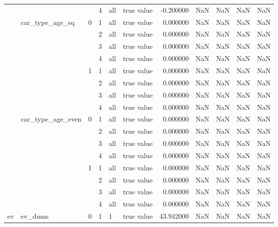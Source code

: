 \begin{tabular}{llllllrrrrr}
 &  &  & 4 & all & true value & -0.200000 & NaN & NaN & NaN & NaN \\
\cline{2-11} \cline{3-11} \cline{4-11} \cline{5-11}
 & \multirow[t]{8}{*}{car_type_age_sq} & \multirow[t]{4}{*}{0} & 1 & all & true value & 0.000000 & NaN & NaN & NaN & NaN \\
\cline{4-11} \cline{5-11}
 &  &  & 2 & all & true value & 0.000000 & NaN & NaN & NaN & NaN \\
\cline{4-11} \cline{5-11}
 &  &  & 3 & all & true value & 0.000000 & NaN & NaN & NaN & NaN \\
\cline{4-11} \cline{5-11}
 &  &  & 4 & all & true value & 0.000000 & NaN & NaN & NaN & NaN \\
\cline{3-11} \cline{4-11} \cline{5-11}
 &  & \multirow[t]{4}{*}{1} & 1 & all & true value & 0.000000 & NaN & NaN & NaN & NaN \\
\cline{4-11} \cline{5-11}
 &  &  & 2 & all & true value & 0.000000 & NaN & NaN & NaN & NaN \\
\cline{4-11} \cline{5-11}
 &  &  & 3 & all & true value & 0.000000 & NaN & NaN & NaN & NaN \\
\cline{4-11} \cline{5-11}
 &  &  & 4 & all & true value & 0.000000 & NaN & NaN & NaN & NaN \\
\cline{2-11} \cline{3-11} \cline{4-11} \cline{5-11}
 & \multirow[t]{8}{*}{car_type_age_even} & \multirow[t]{4}{*}{0} & 1 & all & true value & 0.000000 & NaN & NaN & NaN & NaN \\
\cline{4-11} \cline{5-11}
 &  &  & 2 & all & true value & 0.000000 & NaN & NaN & NaN & NaN \\
\cline{4-11} \cline{5-11}
 &  &  & 3 & all & true value & 0.000000 & NaN & NaN & NaN & NaN \\
\cline{4-11} \cline{5-11}
 &  &  & 4 & all & true value & 0.000000 & NaN & NaN & NaN & NaN \\
\cline{3-11} \cline{4-11} \cline{5-11}
 &  & \multirow[t]{4}{*}{1} & 1 & all & true value & 0.000000 & NaN & NaN & NaN & NaN \\
\cline{4-11} \cline{5-11}
 &  &  & 2 & all & true value & 0.000000 & NaN & NaN & NaN & NaN \\
\cline{4-11} \cline{5-11}
 &  &  & 3 & all & true value & 0.000000 & NaN & NaN & NaN & NaN \\
\cline{4-11} \cline{5-11}
 &  &  & 4 & all & true value & 0.000000 & NaN & NaN & NaN & NaN \\
\cline{1-11} \cline{2-11} \cline{3-11} \cline{4-11} \cline{5-11}
\multirow[t]{202}{*}{ev} & \multirow[t]{202}{*}{ev_dums} & \multirow[t]{101}{*}{0} & \multirow[t]{25}{*}{1} & 1 & true value & 43.942000 & NaN & NaN & NaN & NaN \\

\end{tabular}
